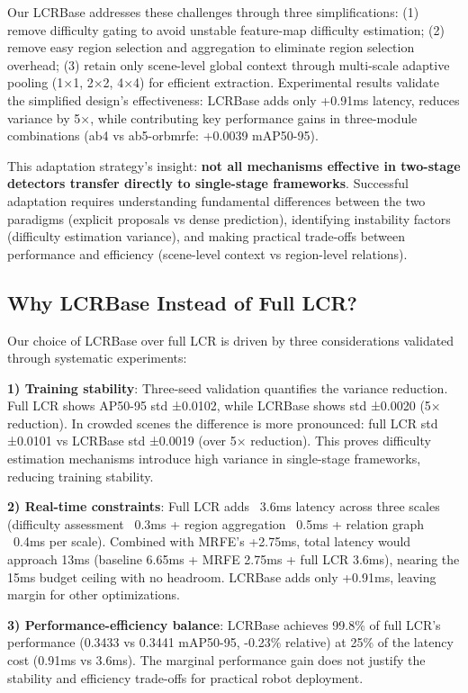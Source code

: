 \documentclass[journal]{IEEEtran}
\begin{document}
Our LCRBase addresses these challenges through three simplifications: (1) remove difficulty gating to avoid unstable feature-map difficulty estimation; (2) remove easy region selection and aggregation to eliminate region selection overhead; (3) retain only scene-level global context through multi-scale adaptive pooling (1×1, 2×2, 4×4) for efficient extraction. Experimental results validate the simplified design's effectiveness: LCRBase adds only +0.91ms latency, reduces variance by 5×, while contributing key performance gains in three-module combinations (ab4 vs ab5-orbmrfe: +0.0039 mAP50-95).

This adaptation strategy's insight: \textbf{not all mechanisms effective in two-stage detectors transfer directly to single-stage frameworks}. Successful adaptation requires understanding fundamental differences between the two paradigms (explicit proposals vs dense prediction), identifying instability factors (difficulty estimation variance), and making practical trade-offs between performance and efficiency (scene-level context vs region-level relations).

\subsection{Why LCRBase Instead of Full LCR?}

Our choice of LCRBase over full LCR is driven by three considerations validated through systematic experiments:

\textbf{1) Training stability}: Three-seed validation quantifies the variance reduction. Full LCR shows AP50-95 std ±0.0102, while LCRBase shows std ±0.0020 (5× reduction). In crowded scenes the difference is more pronounced: full LCR std ±0.0101 vs LCRBase std ±0.0019 (over 5× reduction). This proves difficulty estimation mechanisms introduce high variance in single-stage frameworks, reducing training stability.

\textbf{2) Real-time constraints}: Full LCR adds ~3.6ms latency across three scales (difficulty assessment ~0.3ms + region aggregation ~0.5ms + relation graph ~0.4ms per scale). Combined with MRFE's +2.75ms, total latency would approach 13ms (baseline 6.65ms + MRFE 2.75ms + full LCR 3.6ms), nearing the 15ms budget ceiling with no headroom. LCRBase adds only +0.91ms, leaving margin for other optimizations.

\textbf{3) Performance-efficiency balance}: LCRBase achieves 99.8\% of full LCR's performance (0.3433 vs 0.3441 mAP50-95, -0.23\% relative) at 25\% of the latency cost (0.91ms vs 3.6ms). The marginal performance gain does not justify the stability and efficiency trade-offs for practical robot deployment.
\end{document}

